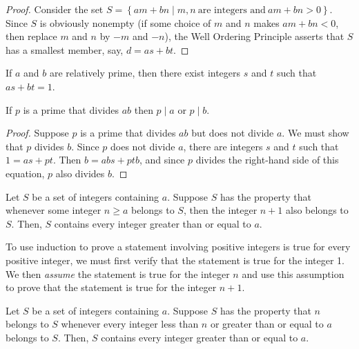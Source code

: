 \documentclass[../butidigress.tex]{subfiles}
\begin{document}
\begin{proof}
Consider the set $S = \left\{am + bn\mid m,n\ \text{are integers and}\ am + bn > 0 \right\}$.
Since $S$ is obviously nonempty (if some choice of $m$ and $n$ makes $am + bn < 0$, then replace $m$ and $n$ by $-m$ and $-n$), the Well Ordering Principle asserts that $S$ has a smallest member, say, $d = as + bt$.
\end{proof}

\begin{corollary}
If $a$ and $b$ are relatively prime, then there exist integers $s$ and $t$ such that $as+bt=1$.
\end{corollary}

\begin{lemma}
If $p$ is a prime that divides $ab$ then $p\mid a$ or $p\mid b$.
\end{lemma}

\begin{proof}
Suppose $p$ is a prime that divides $ab$ but does not divide $a$.
We must show that $p$ divides $b$.
Since $p$ does not divide $a$, there are integers $s$ and $t$ such that $1 = as + pt$.
Then $b = abs + ptb$, and since $p$ divides the right-hand side of this equation, $p$ also divides $b$.
\end{proof}


\begin{theorem}
Let $S$ be a set of integers containing $a$.
Suppose $S$ has the property that whenever some integer $n\geq a$ belongs to $S$, then the integer $n+1$ also belongs to $S$.
Then, $S$ contains every integer greater than or equal to $a$.
\end{theorem}

To use induction to prove a statement involving positive integers is true for every positive integer, we must first verify that the statement is true for the integer 1.
We then \emph{assume} the statement is true for the integer $n$ and use this assumption to prove that the statement is true for the integer $n+1$.

\begin{theorem}
Let $S$ be a set of integers containing $a$.
Suppose $S$ has the property that $n$ belongs to $S$ whenever every integer less than $n$ or greater than or equal to $a$ belongs to $S$.
Then, $S$ contains every integer greater than or equal to $a$.
\end{theorem}
\end{document}
